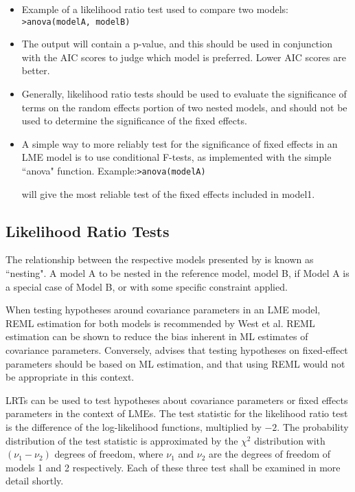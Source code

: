 \documentclass[12pt, a4paper]{report}
\theoremstyle{plain}
\theoremstyle{definition}
\theoremstyle{remark}
\begin{document}
\begin{itemize}
	\item Example of a likelihood ratio test used to compare two models: \newline \texttt{>anova(modelA, modelB)}
	
	\item The output will contain a p-value, and this should be used in conjunction with the AIC scores to judge which model is preferred. Lower AIC scores are better.
	
	\item Generally, likelihood ratio tests should be used to evaluate the significance of terms on the
	random effects portion of two nested models, and should not be used to determine the significance of the fixed effects.
	\item A simple way to more reliably test for the significance of fixed effects in an LME model is to use
	conditional F-tests, as implemented with the simple ``anova" function.
	Example:\newline \texttt{>anova(modelA)}
	
	
	will give the most reliable test of the fixed effects included in model1.
\end{itemize}


\subsection{Likelihood Ratio Tests}
The relationship between the respective models presented by \citet{ARoy2009} is known as ``nesting".
A model A to be nested in the reference model, model B, if Model A is a special case
of Model B, or with some specific constraint applied.


When testing hypotheses around covariance parameters in an LME model, REML
estimation for both models is recommended by West et al. REML estimation can
be shown to reduce the bias inherent in ML estimates of covariance parameters.
Conversely, \citet{ARoy2009} advises that testing hypotheses on fixed-effect parameters should be
based on ML estimation, and that using REML would not be appropriate in this
context.

LRTs can be used to test hypotheses about covariance parameters or fixed effects
parameters in the context of LMEs. The test statistic for the likelihood ratio test
is the difference of the log-likelihood functions, multiplied by $-2$. The probability
distribution of the test statistic is approximated by the $\chi^2$ distribution with $(\nu_1 - \nu_2)$
degrees of freedom, where $\nu_1$ and $\nu_2$ are the degrees of freedom of models 1 and 2
respectively. Each of these three test shall be examined in more detail shortly.
\end{document}

